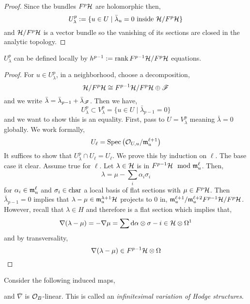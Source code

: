 \documentclass[12pt]{article}
\begin{document}
\begin{proof}
Since the bundles $F^p \mathcal{H}$ are holomorphic then,
\[ U^p_\lambda := \{ u \in U \mid \bar{\lambda}_u = 0 \text{ inside } \mathcal{H} / F^p \mathcal{H} \} \]
and $\mathcal{H} / F^p \mathcal{H}$ is a vector bundle so the vanishing of its sections are closed in the analytic topology.  
\end{proof}

\begin{prop}
$U^p_\lambda$ can be defined locally by $h^{p-1} := \operatorname{\mathrm{rank}}{F^{p-1} \mathcal{H} / F^p \mathcal{H}}$ equations.
\end{prop}

\begin{proof}
For $u \in U^p_\lambda$, in a neighborhood, choose a decomposition,
\[ \mathcal{H} / F^p \mathcal{H} \cong F^{p-1} \mathcal{H} / F^p \mathcal{H} \oplus \mathscr{F} \]
and we write $\bar{\lambda} = \bar{\lambda}_{p-1} + \bar{\lambda}_{\mathscr{F}}$. Then we have,
\[ U^p_\lambda \subset V^p_\lambda = \{ u \in U \mid \bar{\lambda}_{p-1} = 0 \} \]
and we want to show this is an equality. First, pass to $U = V_\lambda^p$ meaning $\bar{\lambda} = 0$ globally. We work formally,
\[ U_\ell = \mathrm{Spec}\left( \mathcal{O}_{U, u} / \mathfrak{m}_u^{\ell + 1} \right) \]
It suffices to show that $U^p_\lambda \cap U_{\ell} = U_\ell$. We prove this by induction on $\ell$. The base case it clear. Assume true for $\ell$. Let $\lambda \in \mathcal{H}$ is in $F^{p-1} \mathcal{H} \mod {\mathfrak{m}}_u^\ell$. Then,
\[ \lambda = \mu - \sum_i \alpha_i \sigma_i \]
for $\alpha_i \in \mathfrak{m}_u^\ell$ and $\sigma_i \in \operatorname{\mathrm{char}}$ a local basis of flat sections with $\mu \in F^p \mathcal{H}$. Then $\bar{\lambda}_{p-1} = 0$ implies that $\lambda - \mu \in \mathfrak{m}_u^{\lambda + 1} \mathcal{H}$ projects to $0$ in, $\mathfrak{m}_u^{\ell + 1} / \mathfrak{m}_u^{\ell + 2} F^{p-1} \mathcal{H} / F^p \mathcal{H}$. 
\bigskip\\
However, recall that $\lambda \in H$ and therefore is a flat section which implies that,
\[ \nabla (\lambda - \mu) = - \nabla \mu = \sum \mathrm{d}{\alpha} \otimes \sigma-i \in \mathcal{H} \otimes \Omega^1 \]
and by transversality,
\[ \nabla (\lambda - \mu) \in F^{p-1} \mathcal{H} \otimes \Omega \]
\end{proof}

\begin{prop}
Consider the following induced maps,
\begin{center}
\end{center}
and $\overline{\nabla}$ is $\mathcal{O}_{B}$-linear. This is called an \textit{infinitesimal variation of Hodge structures}.
\end{prop}
\end{document}
